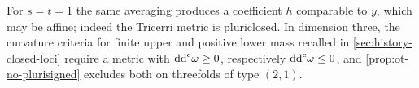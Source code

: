 For $s=t=1$ the same averaging produces a coefficient $h$ comparable to $y$, which may be affine; indeed the Tricerri metric is pluriclosed. In dimension three, the curvature criteria for finite upper and positive lower mass recalled in \cref{sec:history-closed-loci} require a metric with $\mathrm{dd}^{\mathrm{c}}\omega\geq0$, respectively $\mathrm{dd}^{\mathrm{c}}\omega\leq0$, and \cref{prop:ot-no-plurisigned} excludes both on threefolds of type $(2,1)$.
